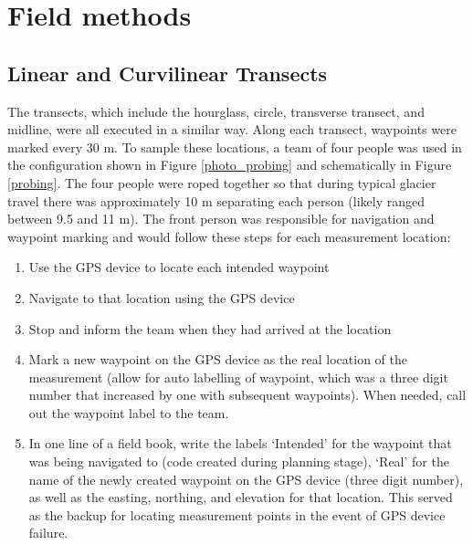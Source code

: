 \documentclass{sfuthesis}
\begin{document}
\section{Field methods}

\subsection{Linear and Curvilinear Transects}
\label{sec:transects}

The transects, which include the hourglass, circle, transverse transect, and midline, were all executed in a similar way. Along each transect, waypoints were marked every 30 m. To sample these locations, a team of four people was used in the configuration shown in Figure \ref{photo_probing} and schematically in Figure \ref{probing}. The four people were roped together so that during typical glacier travel there was approximately 10 m separating each person (likely ranged between 9.5 and 11 m). The front person was responsible for navigation and waypoint marking and would follow these steps for each measurement location:
\begin{enumerate}
\item Use the GPS device to locate each intended waypoint
\item Navigate to that location using the GPS device
\item Stop and inform the team when they had arrived at the location
\item Mark a new waypoint on the GPS device as the real location of the measurement (allow for auto labelling of waypoint, which was a three digit number that increased by one with subsequent waypoints). When needed, call out the waypoint label to the team.
\item In one line of a field book, write the labels `Intended' for the waypoint that was being navigated to (code created during planning stage), `Real' for the name of the newly created waypoint on the GPS device (three digit number), as well as the easting, northing, and elevation for that location. This served as the backup for locating measurement points in the event of GPS device failure. 
\end{enumerate}
\end{document}
